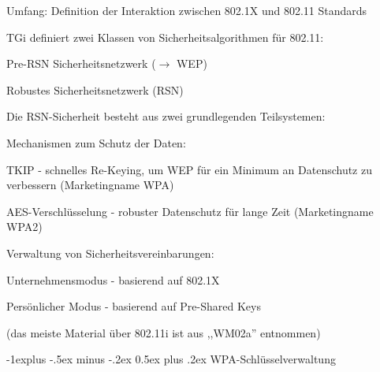\documentclass[a4paper]{article}
\makeatletter
\renewcommand{\subsection}{\@startsection{subsection}{2}{0mm}%
 {-1explus -.5ex minus -.2ex}%
 {0.5ex plus .2ex}%
 {\normalfont\normalsize\bfseries}}
\makeatother
\begin{document}
\begin{multicols}{3}
      \begin{itemize*}
            \item Umfang: Definition der Interaktion zwischen 802.1X und 802.11
            Standards
            \item TGi definiert zwei Klassen von Sicherheitsalgorithmen für 802.11:
            \begin{itemize*}
                  \item Pre-RSN Sicherheitsnetzwerk ($\rightarrow$ WEP)
                  \item Robustes Sicherheitsnetzwerk (RSN)
            \end{itemize*}
            \item Die RSN-Sicherheit besteht aus zwei grundlegenden Teilsystemen:
            \begin{itemize*}
                  \item Mechanismen zum Schutz der Daten:
                  \begin{itemize*}
                        \item TKIP - schnelles Re-Keying, um WEP für ein Minimum an Datenschutz zu verbessern (Marketingname WPA)
                        \item AES-Verschlüsselung - robuster Datenschutz für lange Zeit (Marketingname WPA2)
                  \end{itemize*}
            \end{itemize*}
            \item Verwaltung von Sicherheitsvereinbarungen:
            \begin{itemize*}
                  \item Unternehmensmodus - basierend auf 802.1X
                  \item Persönlicher Modus - basierend auf Pre-Shared Keys
            \end{itemize*}
      \end{itemize*}

      (das meiste Material über 802.11i ist aus ,,WM02a'' entnommen)


      \subsection{WPA-Schlüsselverwaltung}


\end{multicols}
\end{document}
